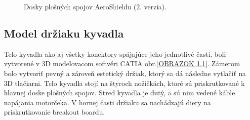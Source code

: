 \begin{figure}
	\hfill
	\hfill
	\hfill
	\caption{Dosky plošných spojov AeroShieldu (2. verzia).}\label{OBRAZOK 2.7}
\end{figure}

\subsection{Model držiaku kyvadla}
\label{telo}

Telo kyvadla ako aj všetky konektory spájajúce jeho jednotlivé časti, boli vytvorené v 3D modelovacom softvéri CATIA obr.\ref{OBRAZOK 1.1}. Zámerom bolo vytvoriť pevný a zároveň estetický držiak, ktorý sa dá následne vytlačiť na 3D tlačiarni. Telo kyvadla stojí na štyroch nožičkách, ktoré sú priskrutkované k hlavnej doske plošných spojov. Stred kyvadla je dutý, a sú nim vedené káble napájania motorčeka. V hornej časti držiaku sa nachádzajú diery na priskrutkovanie breakout boardu. 

